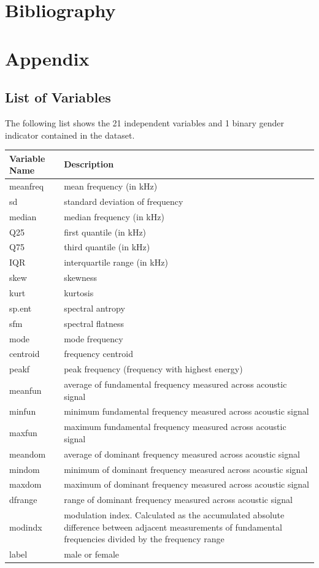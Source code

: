 \documentclass[a4paper]{article}
\begin{document}
\newpage 



\section{Bibliography} %
\label{sec:Bibliography}


\nocite{*}
\printbibliography[heading=none]

\newpage 

\section{Appendix}
\label{sec:appendix}

\subsection{List of Variables}
The following list shows the 21 independent variables and 1 binary gender indicator contained in the dataset.

\begin{center}
\begin{tabular}{ m{5em} | m{10cm}}
\toprule
Variable Name & Description
\tabularnewline
\midrule
meanfreq & mean frequency (in kHz)
\tabularnewline
sd & standard deviation of frequency
\tabularnewline
median & median frequency (in kHz)
\tabularnewline
Q25 & first quantile (in kHz)
\tabularnewline
Q75 & third quantile (in kHz)
\tabularnewline
IQR & interquartile range (in kHz)
\tabularnewline
skew & skewness
\tabularnewline
kurt & kurtosis
\tabularnewline
sp.ent & spectral antropy
\tabularnewline
sfm & spectral flatness
\tabularnewline
mode & mode frequency
\tabularnewline
centroid & frequency centroid
\tabularnewline
peakf & peak frequency (frequency with highest energy)
\tabularnewline
meanfun & average of fundamental frequency measured across acoustic signal
\tabularnewline
minfun & minimum fundamental frequency measured across acoustic signal
\tabularnewline
maxfun & maximum fundamental frequency measured across acoustic signal 
\tabularnewline
meandom & average of dominant frequency measured across acoustic signal 
\tabularnewline
mindom & minimum of dominant frequency measured across acoustic signal 
\tabularnewline
maxdom & maximum of dominant frequency measured across acoustic signal 
\tabularnewline
dfrange & range of dominant frequency measured across acoustic signal 
\tabularnewline
modindx & modulation index. Calculated as the accumulated absolute difference between adjacent measurements of fundamental frequencies divided by the frequency range 
\tabularnewline
label & male or female
\tabularnewline

\bottomrule
\end{tabular}
\end{center}
\end{document}
